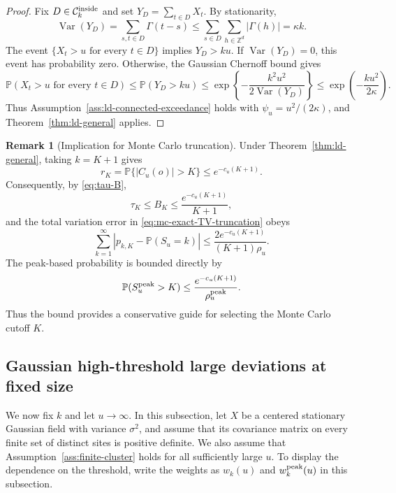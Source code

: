 \documentclass[aap,preprint]{imsart}
\theoremstyle{plain}
\theoremstyle{definition}
\newtheorem{remark}[theorem]{Remark}
\def\P{{\mathbb P}}
\def\Z{{\mathbb Z}}
\begin{document}
\begin{proof}
	Fix $D\in\mathcal C_k^{\rm inside}$ and set
	$Y_D=\sum_{t\in D}X_t$.  By stationarity,
	\[
	\operatorname{Var}(Y_D)
	=\sum_{s,t\in D}\Gamma(t-s)
	\leq
	\sum_{s\in D}\sum_{h\in\Z^d}|\Gamma(h)|
	=\kappa k.
	\]
	The event $\{X_t>u\text{ for every }t\in D\}$ implies $Y_D>ku$.
	If $\operatorname{Var}(Y_D)=0$, this event has probability zero.
	Otherwise, the Gaussian Chernoff bound gives
	\[
	\P(X_t>u\text{ for every }t\in D)
	\leq\P(Y_D>ku)
	\leq
	\exp\!\left\{-\frac{k^2u^2}
	{2\operatorname{Var}(Y_D)}\right\}
	\leq\exp\!\left(-\frac{ku^2}{2\kappa}\right).
	\]
	Thus Assumption~\ref{ass:ld-connected-exceedance} holds with
	$\psi_u=u^2/(2\kappa)$, and
	Theorem~\ref{thm:ld-general} applies.
\end{proof}

\begin{remark}[Implication for Monte Carlo truncation]
	\label{remark:ld-mc-truncation}
	Under Theorem~\ref{thm:ld-general}, taking $k=K+1$ gives
	\begin{equation*}
		r_K=\P\{|C_u(o)|>K\}
		\leq e^{-c_u(K+1)}.
	\end{equation*}
	Consequently, by \eqref{eq:tau-B},
	\begin{equation*}
		\tau_K\leq B_K
		\leq\frac{e^{-c_u(K+1)}}{K+1},
	\end{equation*}
	and the total variation error in
	\eqref{eq:mc-exact-TV-truncation} obeys
	\begin{equation*}
		\sum_{k=1}^{\infty} \left|
		p_{k,K}
		-\P(S_u=k)
		\right|
		\leq
		\frac{2e^{-c_u(K+1)}}{(K+1)\rho_u}.
	\end{equation*}
	The peak-based probability is bounded directly by
	\begin{equation*}
		\P(S_u^{\rm peak}>K)
		\leq\frac{e^{-c_u(K+1)}}{\rho_u^{\rm peak}}.
	\end{equation*}
	Thus the bound provides a conservative guide for selecting
	the Monte Carlo cutoff $K$.
\end{remark}

\subsection{Gaussian high-threshold large deviations at fixed size}
\label{sec:ld-high-threshold}

We now fix $k$ and let $u\to\infty$.  In this subsection, let $X$ be a
centered stationary Gaussian field with variance $\sigma^2$, and assume that its covariance matrix on every finite set of distinct sites
is positive definite.  We also assume that
Assumption~\ref{ass:finite-cluster} holds for all sufficiently large $u$.  To display the dependence on the threshold,
write the weights as $w_k(u)$ and $w_k^{\rm peak}(u)$ in this subsection.
\end{document}
